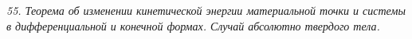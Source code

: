 \emph{55. Теорема об изменении кинетической энергии материальной точки и системы
в дифференциальной и конечной формах. Случай абсолютно твердого тела.}

\newpage
